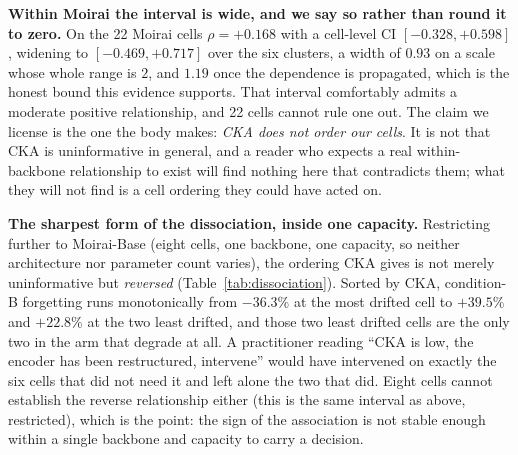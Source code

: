 \begin{table}[!htbp]
\centering\footnotesize
\caption{Is the pooled CKA correlation a backbone artefact? The same statistic
(Spearman $\rho$ of CKA against held-out B$-$D, $10{,}000$-resample bootstrap CI)
computed pooled and then stratified by backbone, at both resampling levels.
``Cl.'' is the number of $(\text{backbone}, \text{dataset})$ clusters, which is
the effective sample size for the clustered interval and is far below $n$. Values
are emitted by \texttt{scripts/clustered\_inference.py}. The pooled row is
reported for audit, not read as evidence; the two small arms carry essentially no
information at their cell counts, and for them the two levels coincide because
every cell is already its own cluster.}
\label{tab:crosscell}

\end{table}

\textbf{Within Moirai the interval is wide, and we say so rather than round it
to zero.} On the 22 Moirai cells $\rho{=}{+}0.168$ with a cell-level CI
$[-0.328, +0.598]$, widening to $[-0.469, +0.717]$ over the six clusters, a
width of $0.93$ on a scale whose whole range is $2$, and $1.19$ once the
dependence is propagated, which is the honest bound this evidence supports. That
interval comfortably
admits a moderate positive relationship, and 22 cells cannot rule one out. The
claim we license is the one the body makes: \emph{CKA does not order our
cells}. It is not that CKA is uninformative in general, and a reader who
expects a real within-backbone relationship to exist will find nothing here
that contradicts them; what they will not find is a cell ordering they could
have acted on.

\textbf{The sharpest form of the dissociation, inside one capacity.} Restricting
further to Moirai-Base (eight cells, one backbone, one capacity, so neither
architecture nor parameter count varies), the ordering CKA gives is not merely
uninformative but \emph{reversed} (Table~\ref{tab:dissociation}). Sorted by CKA,
condition-B forgetting runs monotonically from $-36.3\%$ at the most drifted cell
to $+39.5\%$ and $+22.8\%$ at the two least drifted, and those two least drifted
cells are the only two in the arm that degrade at all. A practitioner reading
``CKA is low, the encoder has been restructured, intervene'' would have
intervened on exactly the six cells that did not need it and left alone the two
that did. Eight cells cannot establish the reverse relationship either (this is
the same interval as above, restricted), which is the point: the sign of the
association is not stable enough within a single backbone and capacity to carry a
decision.

